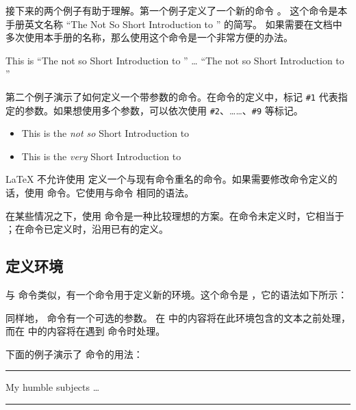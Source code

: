 接下来的两个例子有助于理解。第一个例子定义了一个新的命令 。
这个命令是本手册英文名称 ``The Not So Short Introduction to \LaTeXe'' 的简写。
如果需要在文档中多次使用本手册的名称，那么使用这个命令是一个非常方便的办法。

\begin{example}
\newcommand{\tnss}{The not
    so Short Introduction to
    \LaTeXe}
This is ``\tnss'' \ldots{}
``\tnss''
\end{example}

第二个例子演示了如何定义一个带参数的命令。在命令的定义中，标记 \verb|#1|
代表指定的参数。如果想使用多个参数，可以依次使用 \verb|#2|、……、\verb|#9| 等标记。

\begin{example}
\newcommand{\txsit}[1]
 {This is the \emph{#1} Short
      Introduction to \LaTeXe}
\begin{itemize}
\item \txsit{not so}
\item \txsit{very}
\end{itemize}
\end{example}

\LaTeX{} 不允许使用  定义一个与现有命令重名的命令。如果需要修改命令定义的话，使用  命令。它使用与命令 
相同的语法。

在某些情况之下，使用  命令是一种比较理想的方案。在命令未定义时，它相当于 
；在命令已定义时，沿用已有的定义。

\subsection{定义环境}\label{subsec:newenv}

与  命令类似，有一个命令用于定义新的环境。这个命令是 ，它的语法如下所示：

\begin{command}
\end{command}

同样地， 命令有一个可选的参数。
在  中的内容将在此环境包含的文本之前处理，而在  中的内容将在遇到  命令时处理。

下面的例子演示了  命令的用法：
\begin{example}
\newenvironment{king}
{\rule{1ex}{1ex}%
     \hspace{\stretch{1}}}
{%
     \rule{1ex}{1ex}}

\begin{king}
My humble subjects \ldots
\end{king}
\end{example}


